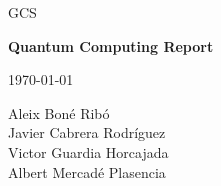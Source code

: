 

\thispagestyle{empty}
\clearpage
\setcounter{page}{-1}

\begin{titlepage}
{
    \centering
    \null
    \vfill
    {\Large GCS\par}
    \vspace{2em}
    {\Huge \bfseries
        Quantum Computing Report
    \par}
    \vspace{2em}
    {\large \scshape
        \today
    \par}
    \vfill
\begin{center}

\end{center}
    \vspace{3cm}

    \vfill
    {\raggedleft \large
Aleix Boné Ribó\\
Javier Cabrera Rodríguez\\
Victor Guardia Horcajada\\
Albert Mercadé Plasencia
        \par}
}
\end{titlepage}
